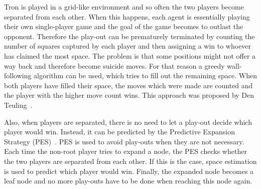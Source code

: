 \documentclass{article}
\begin{document}





Tron is played in a grid-like environment and so often the two players become separated from each other. When this happens, each agent is essentially playing their own single-player game and the goal of the game becomes to outlast the opponent. Therefore the play-out can be prematurely terminated by counting the number of squares captured by each player and then assigning a win to whoever has claimed the most space. The problem is that some positions might not offer a way back and therefore become suicide moves. For that reason a greedy wall-following algorithm can be used, which tries to fill out the remaining space. When both players have filled their space, the moves which were made are counted and the player with the higher move count wins. This approach was proposed by Den Teuling~\cite{teuling_tron}. %

Also, when players are separated, there is no need to let a play-out decide which player would win. Instead, it can be predicted by the Predictive Expansion Strategy (PES)~\cite{teuling_tron}. PES is used to avoid play-outs when they are not necessary. Each time the non-root player tries to expand a node, the PES checks whether the two players are separated from each other. If this is the case, space estimation is used to predict which player would win. Finally, the expanded node becomes a leaf node and no more play-outs have to be done when reaching this node again. 
\end{document}
